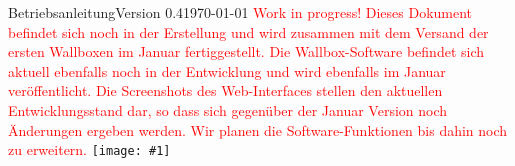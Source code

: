 \documentclass[a4paper,10pt]{article}
\title{}
\author{}
\newcommand{\gfx}[1]{\texttt{[image: \#1]}}
\begin{document}
\begin{titlepage}
	Betriebsanleitung\hfill Version 0.4\hfill \today \centering \vfill
	\colorbox{boxgray}{} \vfill \textcolor{red}{Work in progress!} \vfill
	\textcolor{red}{Dieses Dokument befindet sich noch in der Erstellung und wird zusammen mit dem
		Versand der ersten Wallboxen im Januar fertiggestellt. Die Wallbox-Software
		befindet sich aktuell ebenfalls noch in der Entwicklung und wird ebenfalls im
		Januar veröffentlicht. Die Screenshots des Web-Interfaces stellen den aktuellen
		Entwicklungsstand dar, so dass sich gegenüber der Januar Version noch Änderungen ergeben werden. Wir
		planen die Software-Funktionen bis dahin noch zu erweitern.} \vfill \gfx{./img/resized/warp_perspective_blue_ready}
\end{titlepage}
\end{document}
